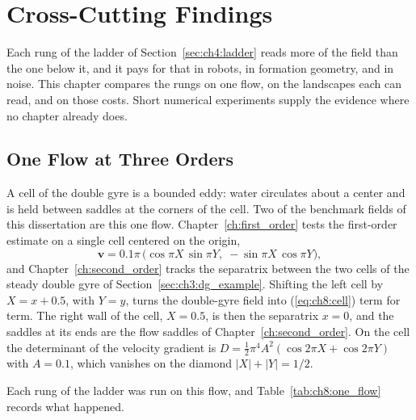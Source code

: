 \chapter{Cross-Cutting Findings}
\label{ch:crosscutting}

Each rung of the ladder of Section~\ref{sec:ch4:ladder} reads more of the
field than the one below it, and it pays for that in robots, in formation
geometry, and in noise. This chapter compares the rungs on one flow, on
the landscapes each can read, and on those costs. Short numerical
experiments supply the evidence where no chapter already does.

\section{One Flow at Three Orders}
\label{sec:ch8:one_flow}

A cell of the double gyre is a bounded eddy: water circulates about a
center and is held between saddles at the corners of the cell. Two of the
benchmark fields of this dissertation are this one flow.
Chapter~\ref{ch:first_order} tests the first-order estimate on a single
cell centered on the origin,
\begin{equation}
    \mathbf{v} = 0.1\pi\,\bigl(\cos\pi X\,\sin\pi Y,\;
    -\sin\pi X\,\cos\pi Y\bigr),
    \label{eq:ch8:cell}
\end{equation}
and Chapter~\ref{ch:second_order} tracks the separatrix between the two
cells of the steady double gyre of Section~\ref{sec:ch3:dg_example}.
Shifting the left cell by $X = x + 0.5$, with $Y = y$, turns the
double-gyre field into (\ref{eq:ch8:cell}) term for term. The right wall
of the cell, $X = 0.5$, is then the separatrix $x = 0$, and the saddles at
its ends are the flow saddles of Chapter~\ref{ch:second_order}. On the
cell the determinant of the velocity gradient is
$D = \tfrac{1}{2}\pi^4 A^2(\cos 2\pi X + \cos 2\pi Y)$ with $A = 0.1$,
which vanishes on the diamond $|X| + |Y| = 1/2$.

Each rung of the ladder was run on this flow, and
Table~\ref{tab:ch8:one_flow} records what happened.

